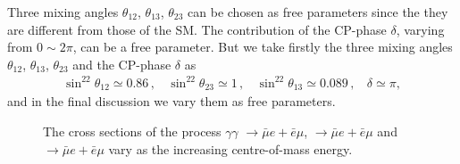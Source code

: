 \documentclass[preprint,aps,12pt,showpacs,nofootinbib,tightenlines]{revtex4}
\newcommand{\MNS}{{\text{MNS}}}
\begin{document}
Three mixing angles $\theta_{12}$, $\theta_{13}$, $\theta_{23}$ can be chosen as free parameters since the
they are different from those of the SM.  The contribution of the CP-phase $\delta$, varying from $0\sim 2\pi$,
can be a free parameter.
But we take firstly the three mixing angles $\theta_{12}$, $\theta_{13}$, $\theta_{23}$
and the CP-phase $\delta$ as\cite{solar,atm,acc,daya-bay,delta}
\begin{eqnarray}
\sin^22\theta_{12}\simeq 0.86 \,,~~~~ \sin^22\theta_{23}\simeq 1 \,,~~~~
\sin^22\theta_{13}\simeq 0.089\,,~~~~\delta\simeq \pi,
\label{obs_para}
\end{eqnarray}
and in the final discussion we vary them as free parameters.




%



\def\figsubcap#1{\par\noindent\centering\footnotesize(#1)}
\begin{figure}[bht]%
\begin{center}
\hspace{-2.5cm}
 \parbox{5.05cm}{ }%
  \caption{ The cross sections of the process $\gamma\gamma$ $\to \bar \mu e + \bar e \mu$,
  $\to \bar \mu e + \bar e \mu$ and $\to \bar \mu e + \bar e \mu$ vary as the increasing centre-of-mass energy.
\label{fig3} }
\end{center}
\end{figure}
\end{document}
